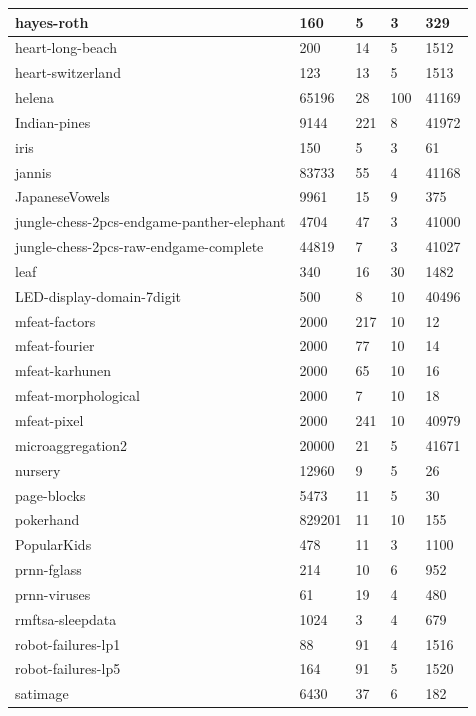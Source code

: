 \documentclass[times,specification,annotation]{itmo-student-thesis}
\begin{document}
\begin{center}
\begin{longtable}{ |m{5cm}|m{2.5cm}|m{2.5cm}|m{2cm}|m{2cm}| }
			\hline
			hayes-roth & 160 & 5 & 3 & 329 \\
			\hline
			heart-long-beach & 200 & 14 & 5 & 1512 \\
			\hline
			heart-switzerland & 123 & 13 & 5 & 1513 \\
			\hline
			helena & 65196 & 28 & 100 & 41169 \\
			\hline
			Indian-pines & 9144 & 221 & 8 & 41972 \\
			\hline
			iris & 150 & 5 & 3 & 61 \\
			\hline
			jannis & 83733 & 55 & 4 & 41168 \\
			\hline
			JapaneseVowels & 9961 & 15 & 9 & 375 \\
			\hline
			jungle-chess-2pcs-endgame-panther-elephant & 4704 & 47 & 3 & 41000 \\
			\hline
			jungle-chess-2pcs-raw-endgame-complete & 44819 & 7 & 3 & 41027 \\
			\hline
			leaf & 340 & 16 & 30 & 1482 \\
			\hline
			LED-display-domain-7digit & 500 & 8 & 10 & 40496 \\
			\hline
			mfeat-factors & 2000 & 217 & 10 & 12 \\
			\hline
			mfeat-fourier & 2000 & 77 & 10 & 14 \\
			\hline
			mfeat-karhunen & 2000 & 65 & 10 & 16 \\
			\hline
			mfeat-morphological & 2000 & 7 & 10 & 18 \\
			\hline
			mfeat-pixel & 2000 & 241 & 10 & 40979 \\
			\hline
			microaggregation2 & 20000 & 21 & 5 & 41671 \\
			\hline
			nursery & 12960 & 9 & 5 & 26 \\
			\hline
			page-blocks & 5473 & 11 & 5 & 30 \\
			\hline
			pokerhand & 829201 & 11 & 10 & 155 \\
			\hline
			PopularKids & 478 & 11 & 3 & 1100 \\
			\hline
			prnn-fglass & 214 & 10 & 6 & 952 \\
			\hline
			prnn-viruses & 61 & 19 & 4 & 480 \\
			\hline
			rmftsa-sleepdata & 1024 & 3 & 4 & 679 \\
			\hline
			robot-failures-lp1 & 88 & 91 & 4 & 1516 \\
			\hline
			robot-failures-lp5 & 164 & 91 & 5 & 1520 \\
			\hline
			satimage & 6430 & 37 & 6 & 182 \\

\end{longtable}
\end{center}
\end{document}
